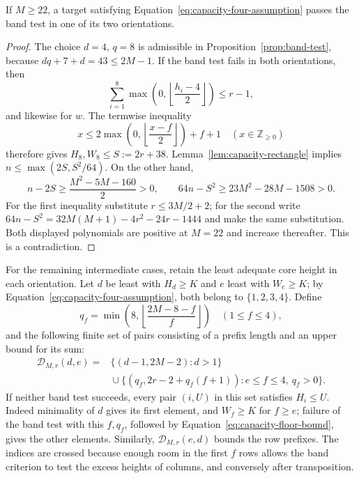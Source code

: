 \begin{lemma}
\label{lem:capacity-large}
If $M\ge22$, a target satisfying
Equation~\eqref{eq:capacity-four-assumption} passes the band test in
one of its two orientations.
\end{lemma}

\begin{proof}
The choice $d=4$, $q=8$ is admissible in
Proposition~\ref{prop:band-test}, because
$dq+7+d=43\le2M-1$. If the band test fails in both orientations,
then
\[
 \sum_{i=1}^8\max\left(0,\left\lfloor\frac{h_i-4}{2}\right\rfloor\right)
 \le r-1,
\]
and likewise for $w$. The termwise inequality
\begin{equation}
 x\le2\max\left(0,\left\lfloor\frac{x-f}{2}\right\rfloor\right)+f+1
 \quad(x\in\mathbb Z_{\ge0})
 \label{eq:capacity-floor-bound}
\end{equation}
therefore gives $H_8,W_8\le S:=2r+38$.
Lemma~\ref{lem:capacity-rectangle} implies
$n\le\max(2S,S^2/64)$. On the other hand,
\[
 n-2S\ge\frac{M^2-5M-160}{2}>0,
 \qquad
 64n-S^2\ge23M^2-28M-1508>0.
\]
For the first inequality substitute $r\le3M/2+2$; for the second
write $64n-S^2=32M(M+1)-4r^2-24r-1444$ and make the same
substitution. Both displayed polynomials are positive at $M=22$
and increase thereafter. This is a contradiction.
\end{proof}

For the remaining intermediate cases, retain the least adequate
core height in each orientation. Let $d$ be least with $H_d\ge K$
and $e$ least with $W_e\ge K$; by
Equation~\eqref{eq:capacity-four-assumption}, both belong to
$\{1,2,3,4\}$. Define
\[
 q_f=\min\left(8,\left\lfloor\frac{2M-8-f}{f}\right\rfloor\right)
 \quad(1\le f\le4),
\]
and the following finite set of pairs consisting of a prefix length
and an upper bound for its sum:
\begin{equation}
 \begin{split}
 \mathcal D_{M,r}(d,e)
 ={}&\{(d-1,2M-2):d>1\}\\
 &{}\cup\{(q_f,2r-2+q_f(f+1)):e\le f\le4,\ q_f>0\}.
 \end{split}
 \label{eq:capacity-D}
\end{equation}
If neither band test succeeds, every pair $(i,U)$ in this set
satisfies $H_i\le U$. Indeed minimality of $d$ gives its first
element, and $W_f\ge K$ for $f\ge e$; failure of the band test with
this $f,q_f$, followed by Equation~\eqref{eq:capacity-floor-bound},
gives the other elements. Similarly,
$\mathcal D_{M,r}(e,d)$ bounds the row prefixes.
The indices are crossed because enough room in the first $f$ rows
allows the band criterion to test the excess heights of columns,
and conversely after transposition.

